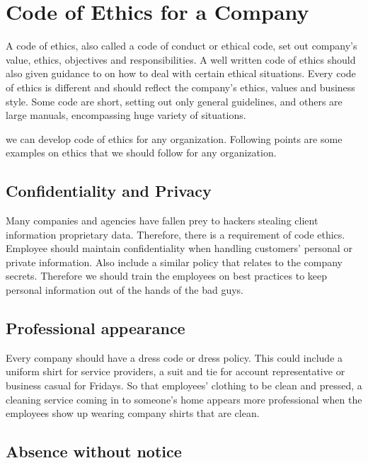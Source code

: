 \documentclass[12pt,a4paper,oneside]{article}
\begin{document}

\newpage
{}
\setcounter{page}{1}


\section{Code of Ethics for a Company}

A code of ethics, also called a code of conduct or ethical code, set out company's value, ethics,
objectives and responsibilities. A well written code of ethics should also given guidance to
on how to deal with certain ethical situations. Every code of ethics is different and
should reflect the company's ethics, values and business style. Some code are short, setting out
only general guidelines, and others are large manuals, encompassing huge variety of situations.

we can develop code of ethics for any organization. Following points are some examples on
ethics that we should follow for any organization.

\subsection{Confidentiality and Privacy}
Many companies and agencies have fallen prey to hackers stealing client information
proprietary data. Therefore, there is a requirement of code ethics. Employee should maintain
confidentiality when handling customers' personal or private information. Also include a
similar policy that relates to the company secrets. Therefore we should train the employees
on best practices to keep personal information out of the hands of the bad guys.

\subsection{Professional appearance}

Every company should have a dress code or dress policy. This could include a uniform shirt
for service providers, a suit and tie for account representative or business casual for Fridays.
So that employees' clothing to be clean and pressed, a cleaning service coming in to
someone's home appears more professional when the employees show up wearing company
shirts that are clean.

\subsection{Absence without notice}
\end{document}
